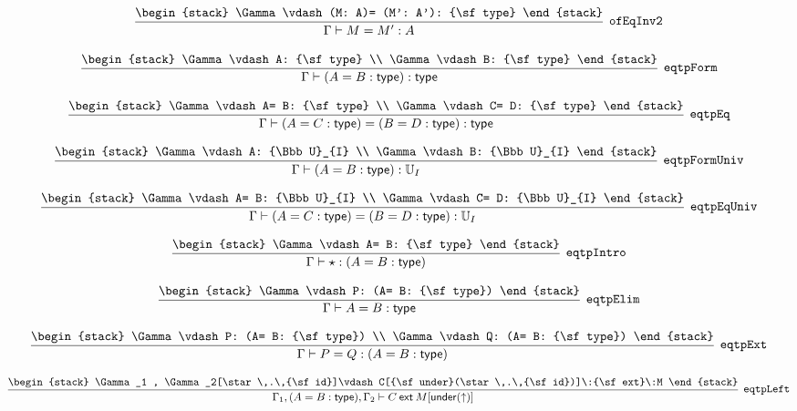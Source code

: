 \[
\infer[{\tt ofEqInv2}]{\Gamma \vdash M= M': A}{
\begin{stack}
\Gamma \vdash (M: A)= (M': A'): {\sf type}
\end{stack}}
\]

\[
\infer[{\tt eqtpForm}]{\Gamma \vdash (A= B: {\sf type}): {\sf type}}{
\begin{stack}
\Gamma \vdash A: {\sf type}
\\
\Gamma \vdash B: {\sf type}
\end{stack}}
\]

\[
\infer[{\tt eqtpEq}]{\Gamma \vdash (A= C: {\sf type})= (B= D: {\sf type}): {\sf type}}{
\begin{stack}
\Gamma \vdash A= B: {\sf type}
\\
\Gamma \vdash C= D: {\sf type}
\end{stack}}
\]

\[
\infer[{\tt eqtpFormUniv}]{\Gamma \vdash (A= B: {\sf type}): {\Bbb U}_{I}}{
\begin{stack}
\Gamma \vdash A: {\Bbb U}_{I}
\\
\Gamma \vdash B: {\Bbb U}_{I}
\end{stack}}
\]

\[
\infer[{\tt eqtpEqUniv}]{\Gamma \vdash (A= C: {\sf type})= (B= D: {\sf type}): {\Bbb U}_{I}}{
\begin{stack}
\Gamma \vdash A= B: {\Bbb U}_{I}
\\
\Gamma \vdash C= D: {\Bbb U}_{I}
\end{stack}}
\]

\[
\infer[{\tt eqtpIntro}]{\Gamma \vdash \star : (A= B: {\sf type})}{
\begin{stack}
\Gamma \vdash A= B: {\sf type}
\end{stack}}
\]

\[
\infer[{\tt eqtpElim}]{\Gamma \vdash A= B: {\sf type}}{
\begin{stack}
\Gamma \vdash P: (A= B: {\sf type})
\end{stack}}
\]

\[
\infer[{\tt eqtpExt}]{\Gamma \vdash P= Q: (A= B: {\sf type})}{
\begin{stack}
\Gamma \vdash P: (A= B: {\sf type})
\\
\Gamma \vdash Q: (A= B: {\sf type})
\end{stack}}
\]

\[
\infer[{\tt eqtpLeft}]{\Gamma_1 ,(A= B: {\sf type}), \Gamma_2 \vdash C\:{\sf ext}\:M[{\sf under}(\uparrow )]}{
\begin{stack}
\Gamma_1 , \Gamma_2[\star \,.\,{\sf id}]\vdash C[{\sf under}(\star \,.\,{\sf id})]\:{\sf ext}\:M
\end{stack}}
\]

